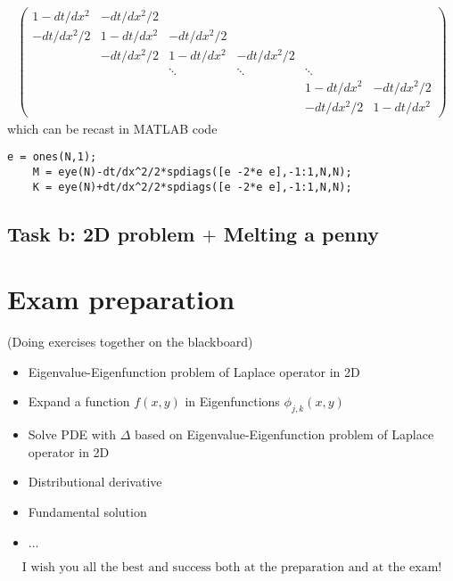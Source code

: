 \documentclass[12pt]{article}
\begin{document}
\begin{align}
	\begin{pmatrix}
		1-dt/dx^2  & -dt/dx^2/2 &            &            &            &            \\
		-dt/dx^2/2 & 1-dt/dx^2  & -dt/dx^2/2 &            &            &            \\
		           & -dt/dx^2/2 & 1-dt/dx^2  & -dt/dx^2/2 &            &            \\
		           &            & \ddots     & \ddots     & \ddots     &            \\
		           &            &            &            & 1-dt/dx^2  & -dt/dx^2/2 \\
		           &            &            &            & -dt/dx^2/2 & 1-dt/dx^2
	\end{pmatrix}
\end{align}
which can be recast in MATLAB code 
\begin{lstlisting}[caption = {Matrix M and K.}]
	e = ones(N,1);
	M = eye(N)-dt/dx^2/2*spdiags([e -2*e e],-1:1,N,N);
	K = eye(N)+dt/dx^2/2*spdiags([e -2*e e],-1:1,N,N);
\end{lstlisting}
\newpage
\subsection{Task b: 2D problem $+$ Melting a penny}
\newpage
\section{Exam preparation}
 (Doing exercises together on the blackboard)
\begin{itemize}
	\item Eigenvalue-Eigenfunction problem of Laplace operator in 2D
	\item Expand a function $f(x,y)$ in Eigenfunctions $\phi_{j,k}(x,y)$
	\item Solve PDE with $\Delta$ based on Eigenvalue-Eigenfunction problem of Laplace operator in 2D
	\item Distributional derivative
	\item Fundamental solution
	\item $\dots$
\end{itemize}
\begin{align*}
	\boxed{
		\text{I wish you all the best and success both at the preparation and at the exam!}
	}
\end{align*}
\end{document}

